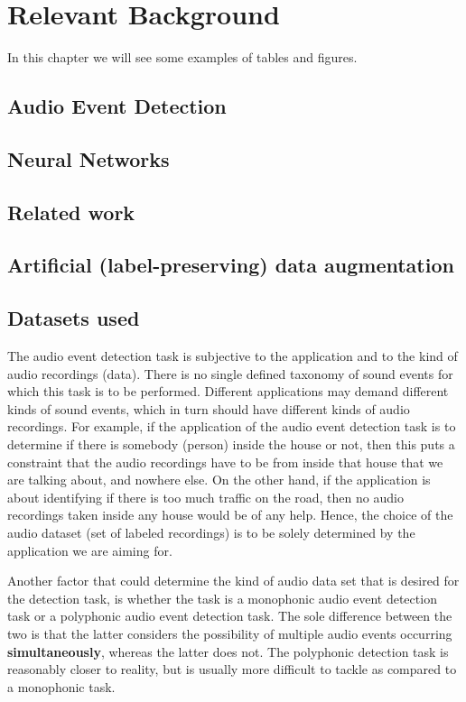 \chapter{Relevant Background}
In this chapter we will see some examples of tables and figures.

\section{Audio Event Detection}

\section{Neural Networks}

\section{Related work}

\section{Artificial (label-preserving) data augmentation}

\section{Datasets used}

The audio event detection task is subjective to the application and to the kind of audio recordings (data). There is no single defined taxonomy of sound events for which this task is to be performed. Different applications may demand different kinds of sound events, which in turn should have different kinds of audio recordings. For example, if the application of the audio event detection task is to determine if there is somebody (person) inside the house or not, then this puts a constraint that the audio recordings have to be from inside that house that we are talking about, and nowhere else. On the other hand, if the application is about identifying if there is too much traffic on the road, then no audio recordings taken inside any house would be of any help. Hence, the choice of the audio dataset (set of labeled recordings) is to be solely determined by the application we are aiming for. 

Another factor that could determine the kind of audio data set that is desired for the detection task, is whether the task is a monophonic audio event detection task or a polyphonic audio event detection task. The sole difference between the two is that the latter considers the possibility of multiple audio events occurring \textbf{simultaneously}, whereas the latter does not. The polyphonic detection task is reasonably closer to reality, but is usually more difficult to tackle as compared to a monophonic task.

